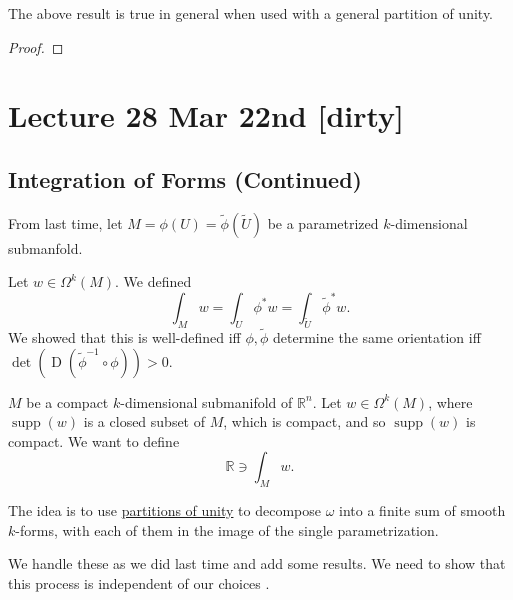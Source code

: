 \documentclass[notoc,notitlepage]{tufte-book}
\DeclareMathOperator{\D}{D}
\DeclareMathOperator{\supp}{supp}
\begin{document}
\begin{note}
  The above result is true in general when used with a general partition of
  unity.
\end{note}

\begin{proof}
  
\end{proof}



\chapter{Lecture 28 Mar 22nd [dirty]}%
\label{chp:lecture_28_mar_22nd}

\section{Integration of Forms (Continued)}%
\label{sec:integration_of_forms_continued}

From last time, let $M = \phi(U) = \tilde{\phi}(\tilde{U})$ be a parametrized
$k$-dimensional submanfold.

Let $w \in \Omega^k(M)$. We defined
\begin{equation*}
  \int_{M} w = \int_{U} \phi^* w = \int_{\tilde{U}} \tilde{\phi}^* w .
\end{equation*}
We showed that this is well-defined iff $\phi, \tilde{\phi}$ determine the same
orientation iff $\det (\D (\tilde{\phi}^{-1} \circ \phi)) > 0$.

 $M$ be a compact $k$-dimensional submanifold of
$\mathbb{R}^n$. Let $w \in \Omega^k(M)$, where $\supp(w)$ is a closed subset of
$M$, which is compact, and so $\supp(w)$ is compact. We want to define
\begin{equation*}
  \mathbb{R} \ni \int_{M} w. 
\end{equation*}

The idea is to use \hyperref[sec:partitions_of_unity_continued]{partitions of
unity} to decompose $\omega$ into a finite sum of smooth $k$-forms, with each of them
 in the image of the single parametrization.

We handle these as we did last time and add some results. We need to show that
this process is independent of our choices .
\end{document}
